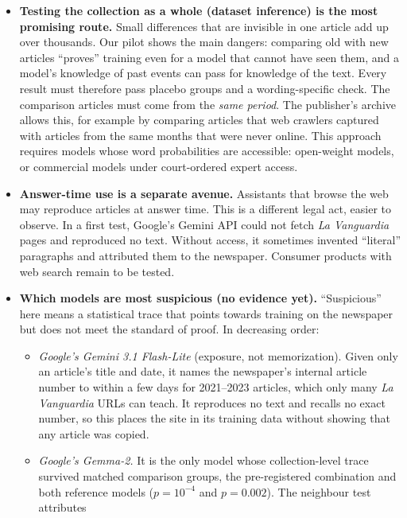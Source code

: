 \documentclass[10pt,a4paper]{article}
\begin{document}
\begin{itemize}
same facts), the result still points the same way but is not statistically significant ($p\approx0.07$). An
independent replication, with its analysis fixed in advance, found the same direction and size, again not significant
($p\approx0.07$--$0.10$): not confirmed.
\item \textbf{Testing the collection as a whole (dataset inference) is the most promising route.} Small differences
that are invisible in one article add up over thousands. Our pilot shows the main dangers: comparing old with new articles ``proves'' training even for a model
that cannot have seen them, and a model's knowledge of past events can pass for knowledge of the text. Every result
must therefore pass placebo groups and a wording-specific check. The comparison articles must come from the \emph{same period}. The publisher's archive
allows this, for example by comparing articles that web crawlers captured with articles from the same months that
were never online. This approach requires models whose word probabilities are accessible: open-weight models, or
commercial models under court-ordered expert access.
\item \textbf{Answer-time use is a separate avenue.} Assistants that browse the web may reproduce articles at
answer time. This is a different legal act, easier to observe. In a first test, Google's Gemini API could not fetch
\emph{La Vanguardia} pages and reproduced no text. Without access, it sometimes invented ``literal'' paragraphs and
attributed them to the newspaper. Consumer products with web search remain to be tested.
\item \textbf{Which models are most suspicious (no evidence yet).} ``Suspicious'' here means a statistical trace
that points towards training on the newspaper but does not meet the standard of proof. In decreasing order:
\begin{itemize}
\item \emph{Google's Gemini 3.1 Flash-Lite} (exposure, not memorization). Given only an article's title and date,
it names the newspaper's internal article number to within a few days for 2021--2023 articles, which only many
\emph{La Vanguardia} URLs can teach. It reproduces no text and recalls no exact number, so this places the site in its
training data without showing that any article was copied.
\item \emph{Google's Gemma-2.} It is the only model whose collection-level trace survived matched comparison groups,
the pre-registered combination and both reference models ($p=10^{-4}$ and $p=0.002$). The neighbour test attributes

\end{itemize}
\end{itemize}
\end{document}
